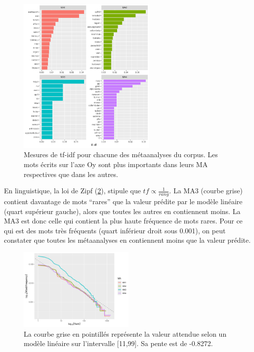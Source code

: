 \documentclass{book}
\begin{document}
\begin{figure}[htb] %
    \begin{center} %
        \includegraphics[width=0.6\textwidth]{graphe_tf_idf.png}
        \caption{Mesures de tf-idf pour chacune des métaanalyses du corpus. Les mots écrits sur l'axe Oy sont plus importants dans leurs MA respectives que dans les autres.\label{graph_tf_idf}}
    \end{center}  
\end{figure}

\newpage
En linguistique, la loi de Zipf (\cref{zipf}), stipule que
$tf \propto \frac{1}{rang}$. La MA3 (courbe grise) contient davantage de mots “rares” que la valeur prédite par le modèle linéaire (quart supérieur gauche), alors que toutes les autres en contiennent moins. La MA3 est donc celle qui contient la plus haute fréquence de mots rares. Pour ce qui est des mots très fréquents (quart inférieur droit sous 0.001), on peut constater que toutes les métaanalyses en contiennent moins que la valeur prédite.

\begin{figure}[htb] %
    \begin{center} %
        \includegraphics[width=0.5\textwidth]{curve_zipf.png}
        \caption{La courbe grise en pointillés représente la valeur attendue selon un modèle linéaire sur l'intervalle [11,99]. Sa pente est de -0.8272.\label{zipf}}
    \end{center}  
\end{figure}
\FloatBarrier{}
\end{document}
